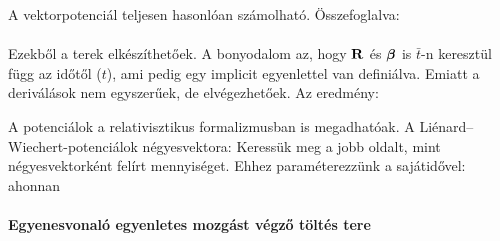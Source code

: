    A vektorpotenciál teljesen hasonlóan számolható. Összefoglalva:
   \\[6pt]
   \\[3pt]
   
   Ezekből a terek elkészíthetőek. A bonyodalom az, hogy $\mathbf{R}$ és $\boldsymbol{\beta}$ is $\bar t$-n keresztül függ az időtől ($t$), ami pedig egy implicit egyenlettel van definiálva. Emiatt a deriválások nem egyszerűek, de elvégezhetőek. Az eredmény:
   
   A potenciálok a relativisztikus formalizmusban is megadhatóak. A Li\-é\-nard--Wie\-chert-po\-ten\-ci\-ál\-ok négyesvektora:
   Keressük meg a jobb oldalt, mint négyesvektorként felírt mennyiséget. Ehhez paraméterezzünk a sajátidővel: 
   ahonnan
   
   \paragraph{Egyenesvonaló egyenletes mozgást végző töltés tere}
    
